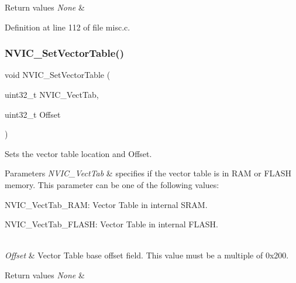 \begin{DoxyRetVals}{Return values}
{\em None} & \\
\hline
\end{DoxyRetVals}


Definition at line 112 of file misc.\+c.

\mbox{\label{group___m_i_s_c___private___functions_ga1145208ad70edfc2fab19b8b8ef1b1a1}} 
\subsubsection{\texorpdfstring{N\+V\+I\+C\+\_\+\+Set\+Vector\+Table()}{NVIC\_SetVectorTable()}}
{\footnotesize\ttfamily void N\+V\+I\+C\+\_\+\+Set\+Vector\+Table (\begin{DoxyParamCaption}\item[{uint32\+\_\+t}]{N\+V\+I\+C\+\_\+\+Vect\+Tab,  }\item[{uint32\+\_\+t}]{Offset }\end{DoxyParamCaption})}



Sets the vector table location and Offset. 


\begin{DoxyParams}{Parameters}
{\em N\+V\+I\+C\+\_\+\+Vect\+Tab} & specifies if the vector table is in R\+AM or F\+L\+A\+SH memory. This parameter can be one of the following values\+: \begin{DoxyItemize}
\item N\+V\+I\+C\+\_\+\+Vect\+Tab\+\_\+\+R\+AM\+: Vector Table in internal S\+R\+AM. \item N\+V\+I\+C\+\_\+\+Vect\+Tab\+\_\+\+F\+L\+A\+SH\+: Vector Table in internal F\+L\+A\+SH. \end{DoxyItemize}
\\
\hline
{\em Offset} & Vector Table base offset field. This value must be a multiple of 0x200. \\
\hline
\end{DoxyParams}

\begin{DoxyRetVals}{Return values}
{\em None} & \\
\hline
\end{DoxyRetVals}


